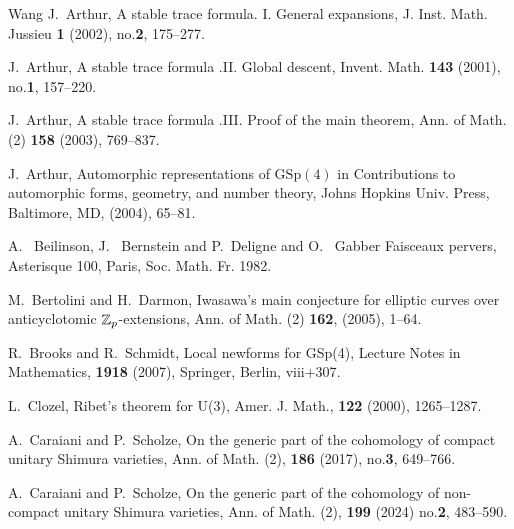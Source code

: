\documentclass[10pt]{amsart}
\numberwithin{equation}{section}
\theoremstyle{definition}
\def\GSp{\mathrm{GSp}}
\begin{document}
\begin{thebibliography}{Wang}
J.~Arthur,
{A stable trace formula. I. General expansions}, J. Inst. Math. Jussieu {\bf 1} (2002), no.{\bf 2}, 175--277. 
 
J.~Arthur,
{A stable trace formula .II. Global descent}, Invent. Math. {\bf 143} (2001), no.{\bf 1}, 157--220. 

J.~Arthur,
{A stable trace formula .III. Proof of the main theorem}, Ann. of Math. (2) {\bf 158} (2003), 769--837. 

J.~Arthur, {Automorphic representations of $\GSp(4)$}
{in Contributions to automorphic forms, geometry, and number theory}, {Johns Hopkins Univ. Press}, {Baltimore, MD}, (2004), 65--81.

A.~ Beilinson, J.~ Bernstein and P.~Deligne and O.~ Gabber 
{Faisceaux pervers}, Asterisque 100, Paris, Soc. Math. Fr. 1982.
 
M.~Bertolini and H.~Darmon,
{Iwasawa's main conjecture for elliptic curves over anticyclotomic {$\Bbb Z_p$}-extensions}, Ann. of Math. (2) {\bf 162}, (2005), 1--64. 

R.~Brooks and R.~Schmidt, {Local newforms for GSp(4)}, {Lecture Notes in Mathematics}, {\bf 1918} (2007), {Springer, Berlin}, {viii+307}.

L.~Clozel, {Ribet's theorem for U(3)}, {Amer. J. Math.}, {\bf 122} (2000), 1265--1287. 



A.~Caraiani and P.~Scholze, {On the generic part of the cohomology of compact unitary Shimura
   varieties}, {Ann. of Math. (2)}, {\bf 186} (2017), no.{\bf3}, 649--766.
   
A.~Caraiani and P.~Scholze, {On the generic part of the cohomology of non-compact unitary Shimura
   varieties}, {Ann. of Math. (2)}, {\bf 199} (2024) no.{\bf2}, 483--590. 


\end{thebibliography}
\end{document}
